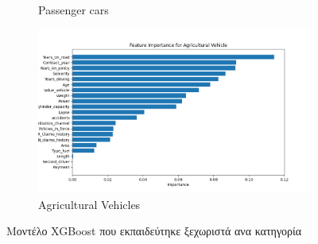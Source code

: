 \documentclass{llncs}
\begin{document}
\begin{figure}
\begin{subfigure}{0.45\linewidth}
       \caption{Passenger cars}
       \label{fig:subrandom3}
        \end{subfigure}
         \begin{subfigure}{0.45\linewidth}
        \includegraphics[width=\linewidth]{images/Agricultural Vehicle_feature_importance_random_forest.png}
        \caption{Agricultural Vehicles}
        \label{fig:subrandom4}
         \end{subfigure}
  \caption{Μοντέλο XGBoost που εκπαιδεύτηκε ξεχωριστά ανα κατηγορία}
  \label{fig:RandomForest_split_importance}
\end{figure}
\end{document}
